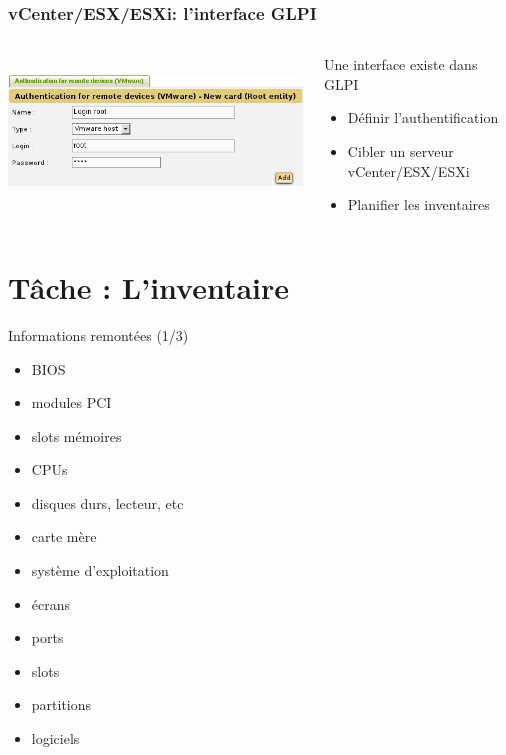 \documentclass{beamer}
\begin{document}
\begin{frame}[fragile]
    \frametitle{vCenter/ESX/ESXi: l'interface GLPI}

 \begin{columns}
 \begin{column}[T]{4cm}
    \includegraphics[height=4.0cm]{pics/esx-glpi.jpg}
 \end{column}
 \begin{column}[t]{6cm}
    \begin{block}{Une interface existe dans GLPI}
    \begin{itemize}
         \item Définir l'authentification
         \item Cibler un serveur vCenter/ESX/ESXi
         \item Planifier les inventaires
    \end{itemize}
    \end{block}
 \end{column}
\end{columns}




\end{frame}

\section{Tâche : L'inventaire}

\begin{frame}
    \begin{block}{Informations remontées (1/3)}
        \begin{itemize}
        \item BIOS
        \item modules PCI
        \item slots mémoires
        \item CPUs
        \item disques durs, lecteur, etc
        \item carte mère
        \item système d'exploitation
        \item écrans
        \item ports
        \item slots
        \item partitions
        \item logiciels
        \end{itemize}
    \end{block}
\end{frame}
\end{document}
